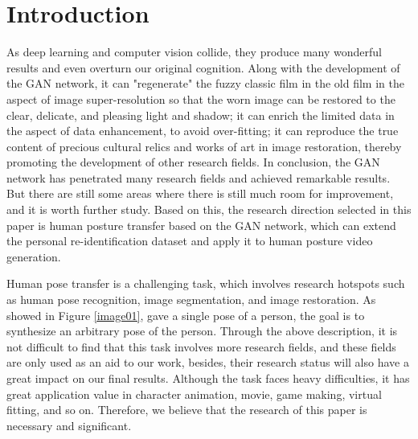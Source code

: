 \section{Introduction}
\label{intro}
	
As deep learning and computer vision collide, they produce many wonderful results and even overturn our original cognition. Along with the development of the GAN \cite{mirza2014conditional} network, it can "regenerate" the fuzzy classic film in the old film in the aspect of image super-resolution so that the worn image can be restored to the clear, delicate, and pleasing light and shadow; it can enrich the limited data in the aspect of data enhancement, to avoid over-fitting; it can reproduce the true content of precious cultural relics and works of art in image restoration, thereby promoting the development of other research fields. In conclusion, the GAN network has penetrated many research fields and achieved remarkable results. But there are still some areas where there is still much room for improvement, and it is worth further study. Based on this, the research direction selected in this paper is human posture transfer based on the GAN network, which can extend the personal re-identification dataset and apply it to human posture video generation.

Human pose transfer is a challenging task, which involves research hotspots such as human pose recognition, image segmentation, and image restoration. As showed in Figure \ref{image01}, gave a single pose of a person, the goal is to synthesize an arbitrary pose of the person. Through the above description, it is not difficult to find that this task involves more research fields, and these fields are only used as an aid to our work, besides, their research status will also have a great impact on our final results. Although the task faces heavy difficulties, it has great application value in character animation, movie, game making, virtual fitting, and so on. Therefore, we believe that the research of this paper is necessary and significant.

